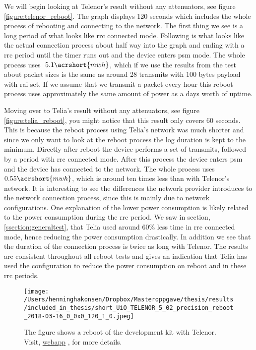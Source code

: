 \documentclass[USenglish]{ifimaster}  %
\begin{document}
We will begin looking at Telenor's result without any attenuators, see figure \vref{figure:telenor_reboot}. The graph displays 120 seconds which includes the whole process of rebooting and connecting to the network. The first thing we see is a long period of what looks like \acrshort{rrc} connected mode. Following is what looks like the actual connection process about half way into the graph and ending with a \acrshort{rrc} period until the timer runs out and the device enters \acrshort{psm} mode. The whole process uses ${~5.1 \acrshort{mwh}}$, which if we use the results from the test about packet sizes is the same as around 28 transmits with 100 bytes payload with \acrshort{rai} set. If we assume that we transmit a packet every hour this reboot process uses approximately the same amount of power as a days worth of uptime.

Moving over to Telia's result without any attenuators, see figure \vref{figure:telia_reboot}, you might notice that this result only covers 60 seconds. This is because the reboot process using Telia's network was much shorter and since we only want to look at the reboot process the log duration is kept to the minimum. Directly after reboot the device performs a set of transmits, followed by a period with \acrshort{rrc} connected mode. After this process the device enters \acrshort{psm} and the device has connected to the network. The whole process uses ${0.55 \acrshort{mwh}}$, which is around ten times less than with Telenor's network. It is interesting to see the differences the network provider introduces to the network connection process, since this is mainly due to network configurations. One explanation of the lower power consumption is likely related to the power consumption during the \acrshort{rrc} period. We saw in section, \vref{ssection:generaltest}, that Telia used around 60\% less time in \acrshort{rrc} connected mode, hence reducing the power consumption drastically. In addition we see that the duration of the connection process is twice as long with Telenor. The results are consistent throughout all reboot tests and gives an indication that Telia has used the configuration to reduce the power consumption on reboot and in these \acrshort{rrc} periods.

\begin{figure}[H]
  \centering
  \texttt{[image: /Users/henninghakonsen/Dropbox/Masteroppgave/thesis/results/included\_in\_thesis/short\_UiO\_TELENOR\_5\_02\_precision\_reboot\_2018-03-16\_0\_0x0\_120\_1\_0.jpeg]}
  \caption[Short-term test - device reboot, Telenor]{The figure shows a reboot of the development kit with Telenor. Visit, \href{http://158.39.77.97:9000/\#/results/UiO\_TELENOR\_5.02\_precision\_reboot\_2018-03-16\_0\_0x0\_120\_1\_0}{webapp} \cite{online:result9}, for more details.}
  \label{figure:telenor_reboot}
\end{figure}
\end{document}
